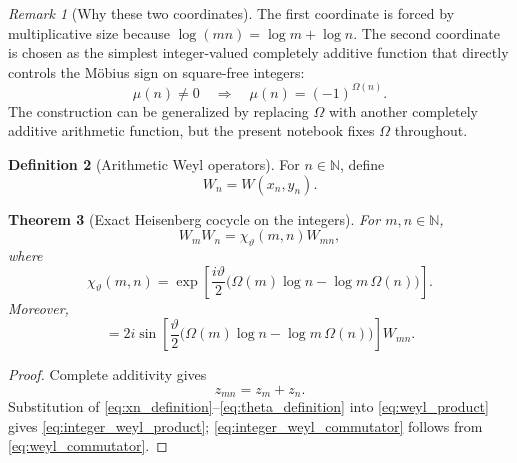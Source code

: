 \documentclass[11pt]{amsart}
\numberwithin{equation}{section}
\theoremstyle{plain}
\newtheorem{theorem}{Theorem}[section]
\theoremstyle{definition}
\newtheorem{definition}[theorem]{Definition}
\theoremstyle{remark}
\newtheorem{remark}[theorem]{Remark}
\newcommand{\N}{\mathbb{N}}
\newcommand{\Om}{\Omega}
\begin{document}
\begin{remark}[Why these two coordinates]
\label{rem:why_coordinates}
The first coordinate is forced by multiplicative size because
$\log(mn)=\log m+\log n$.  The second coordinate is chosen as the simplest
integer-valued completely additive function that directly controls the
M\"obius sign on square-free integers:
\begin{equation}
\mu(n)\neq0
\quad\Longrightarrow\quad
\mu(n)=(-1)^{\Om(n)}.
\label{eq:mobius_Omega_relation}
\end{equation}
The construction can be generalized by replacing $\Om$ with another
completely additive arithmetic function, but the present notebook fixes $\Om$ throughout.
\end{remark}

\begin{definition}[Arithmetic Weyl operators]
\label{def:arithmetic_weyl_operator}
For $n\in\N$, define
\begin{equation}
W_n=W(x_n,y_n).
\label{eq:Wn_definition}
\end{equation}
\end{definition}

\begin{theorem}[Exact Heisenberg cocycle on the integers]
\label{thm:integer_weyl_cocycle}
For $m,n\in\N$,
\begin{equation}
W_mW_n
=
\chi_{\vartheta}(m,n)W_{mn},
\label{eq:integer_weyl_product}
\end{equation}
where
\begin{equation}
\chi_{\vartheta}(m,n)
=
\exp\!\left[
\frac{i\vartheta}{2}
\bigl(\Om(m)\log n-\log m\,\Om(n)\bigr)
\right].
\label{eq:chi_definition}
\end{equation}
Moreover,
\begin{equation}
[W_m,W_n]
=
2i\sin\!\left[
\frac{\vartheta}{2}
\bigl(\Om(m)\log n-\log m\,\Om(n)\bigr)
\right]W_{mn}.
\label{eq:integer_weyl_commutator}
\end{equation}
\end{theorem}

\begin{proof}
Complete additivity gives
\begin{equation}
z_{mn}=z_m+z_n.
\label{eq:phase_space_additivity}
\end{equation}
Substitution of \eqref{eq:xn_definition}--\eqref{eq:theta_definition} into
\eqref{eq:weyl_product} gives \eqref{eq:integer_weyl_product};
\eqref{eq:integer_weyl_commutator} follows from
\eqref{eq:weyl_commutator}.
\end{proof}
\end{document}
